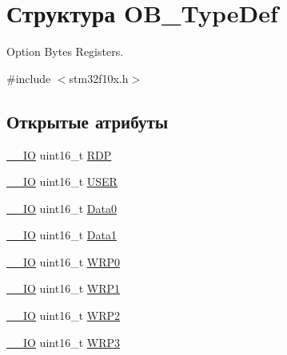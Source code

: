 \hypertarget{struct_o_b___type_def}{}\section{Структура O\+B\+\_\+\+Type\+Def}
\label{struct_o_b___type_def}


Option Bytes Registers.  




{\ttfamily \#include $<$stm32f10x.\+h$>$}

\subsection*{Открытые атрибуты}
\begin{DoxyCompactItemize}
\item 
\mbox{\hyperlink{group___c_m_s_i_s___c_m3__core__definitions_gaec43007d9998a0a0e01faede4133d6be}{\+\_\+\+\_\+\+IO}} uint16\+\_\+t \mbox{\hyperlink{struct_o_b___type_def_ad9f9ae594003c39cc27f147e29a130bb}{R\+DP}}
\item 
\mbox{\hyperlink{group___c_m_s_i_s___c_m3__core__definitions_gaec43007d9998a0a0e01faede4133d6be}{\+\_\+\+\_\+\+IO}} uint16\+\_\+t \mbox{\hyperlink{struct_o_b___type_def_ab0292062a80446c97dac24604bd8ed8e}{U\+S\+ER}}
\item 
\mbox{\hyperlink{group___c_m_s_i_s___c_m3__core__definitions_gaec43007d9998a0a0e01faede4133d6be}{\+\_\+\+\_\+\+IO}} uint16\+\_\+t \mbox{\hyperlink{struct_o_b___type_def_a7570c0ba4b4d31c6061d595279e6b36e}{Data0}}
\item 
\mbox{\hyperlink{group___c_m_s_i_s___c_m3__core__definitions_gaec43007d9998a0a0e01faede4133d6be}{\+\_\+\+\_\+\+IO}} uint16\+\_\+t \mbox{\hyperlink{struct_o_b___type_def_a4e0e4a89db7004fb08a8a19129e9970e}{Data1}}
\item 
\mbox{\hyperlink{group___c_m_s_i_s___c_m3__core__definitions_gaec43007d9998a0a0e01faede4133d6be}{\+\_\+\+\_\+\+IO}} uint16\+\_\+t \mbox{\hyperlink{struct_o_b___type_def_acee93898f092604a871e52d64560e7a9}{W\+R\+P0}}
\item 
\mbox{\hyperlink{group___c_m_s_i_s___c_m3__core__definitions_gaec43007d9998a0a0e01faede4133d6be}{\+\_\+\+\_\+\+IO}} uint16\+\_\+t \mbox{\hyperlink{struct_o_b___type_def_ad397993d8c149a64e3f2a8bc7ecdf1c5}{W\+R\+P1}}
\item 
\mbox{\hyperlink{group___c_m_s_i_s___c_m3__core__definitions_gaec43007d9998a0a0e01faede4133d6be}{\+\_\+\+\_\+\+IO}} uint16\+\_\+t \mbox{\hyperlink{struct_o_b___type_def_a475b2347222db8e35d7ade1a881ca31c}{W\+R\+P2}}
\item 
\mbox{\hyperlink{group___c_m_s_i_s___c_m3__core__definitions_gaec43007d9998a0a0e01faede4133d6be}{\+\_\+\+\_\+\+IO}} uint16\+\_\+t \mbox{\hyperlink{struct_o_b___type_def_ab8bdaebc42e051ff9911eb88dad75f92}{W\+R\+P3}}
\end{DoxyCompactItemize}


